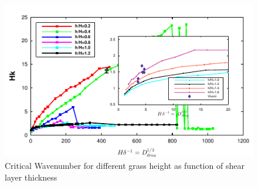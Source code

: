 \documentclass[aps,prl,twocolumn,showpacs,superscriptaddress,groupedaddress,10pt]{revtex4-1}  %
\begin{document}
\begin{figure}[htb]
\includegraphics[]{K_vs_shear_width_noshear}
\caption{Critical Wavenumber for different grass height as function of shear layer thickness}
\label{K_vs_shear}
\end{figure}
\end{document}
